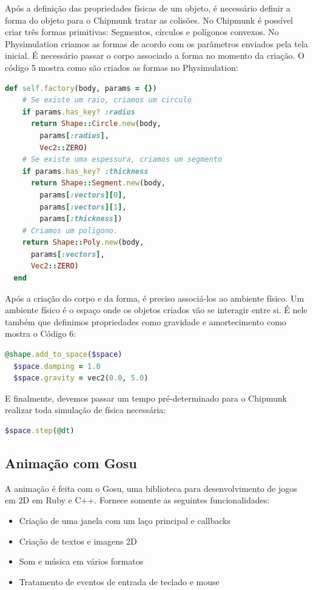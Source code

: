 Após a definição das propriedades físicas de um objeto, é necessário definir a forma do objeto para o Chipmunk tratar as colisões. No Chipmunk é 
possível criar três formas primitivas: Segmentos, círculos e polígonos convexos. No Physimulation criamos as formas de acordo com os parâmetros enviados
pela tela inicial. É necessário passar o corpo associado a forma no momento da criação. O código 5 mostra como são criados as formas no Physimulation:

\begin{lstlisting}[language=Ruby, caption=physics.rb]
  def self.factory(body, params = {})
    # Se existe um raio, criamos um circulo
    if params.has_key? :radius
      return Shape::Circle.new(body, 
        params[:radius], 
        Vec2::ZERO)
    # Se existe uma espessura, criamos um segmento
    if params.has_key? :thickness
      return Shape::Segment.new(body, 
        params[:vectors][0], 
        params[:vectors][1], 
        params[:thickness])
    # Criamos um poligono.
    return Shape::Poly.new(body, 
      params[:vectors], 
      Vec2::ZERO)
  end
\end{lstlisting}

Após a criação do corpo e da forma, é preciso associá-los ao ambiente físico. Um ambiente físico é o espaço onde os objetos criados vão se interagir entre si. É 
nele também que definimos propriedades como gravidade e amortecimento como mostra o Código 6:

\begin{lstlisting}[language=Ruby, caption=physics.rb]
  @shape.add_to_space($space)
  $space.damping = 1.0
  $space.gravity = vec2(0.0, 5.0)
\end{lstlisting}

E finalmente, devemos passar um tempo pré-determinado para o Chipmunk realizar toda simulação de física necessária:

\begin{lstlisting}[language=Ruby, caption=physics.rb]
  $space.step(@dt)
\end{lstlisting}

\subsection{Animação com Gosu}
A animação é feita com o Gosu, uma biblioteca para desenvolvimento de jogos em 2D em Ruby e C++. Fornece somente as seguintes funcionalidades:
\begin{itemize}
  \item Criação de uma janela com um laço principal e callbacks
  \item Criação de textos e imagens 2D
  \item Som e música em vários formatos
  \item Tratamento de eventos de entrada de teclado e mouse
\end{itemize}

